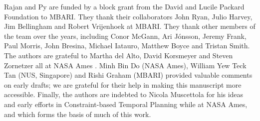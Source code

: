 \documentclass[graybox,12pt]{svmult}
\begin{document}
Rajan and Py are funded by a block grant from the David and Lucile
Packard Foundation to MBARI. They thank their collaborators John Ryan,
Julio Harvey, Jim Bellingham and Robert Vrijenhoek at MBARI. They
thank other members of the \eu team over the years, including Conor
McGann, Ari J\'onsson, Jeremy Frank, Paul Morris, John Bresina,
Michael Iatauro, Matthew Boyce and Tristan Smith.  The authors are
grateful to Martha del Alto, David Korsmeyer and Steven Zornetzer all
at NASA Ames . Minh Bin Do (NASA Ames),
William Yew Teck Tan (NUS, Singapore) and Rishi Graham (MBARI)
provided valuable comments on early drafts; we are grateful for their
help in making this manuscript more accessible. Finally, the authors
are indebted to Nicola Muscettola  for his ideas
and early efforts in Constraint-based Temporal Planning while at NASA
Ames, and which forms the basis of much of this work.



\end{document}
